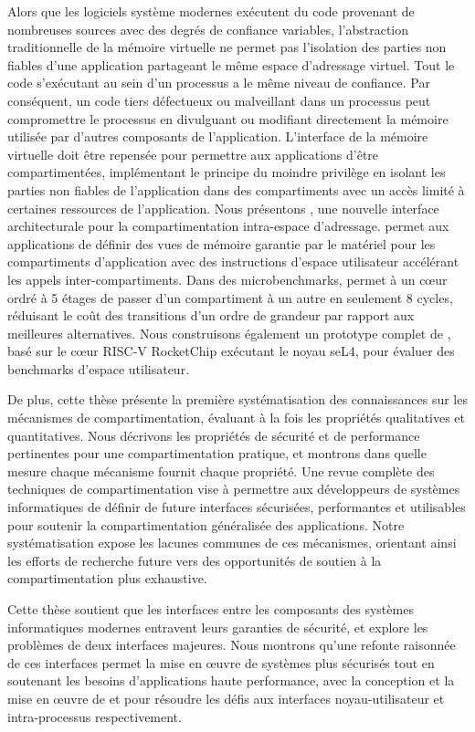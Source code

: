 Alors que les logiciels système modernes exécutent du code provenant de nombreuses sources avec des degrés de confiance variables, l'abstraction traditionnelle de la mémoire virtuelle ne permet pas l'isolation des parties non fiables d'une application partageant le même espace d'adressage virtuel. 
Tout le code s'exécutant au sein d'un processus a le même niveau de confiance. 
Par conséquent, un code tiers défectueux ou malveillant dans un processus peut compromettre le processus en divulguant ou modifiant directement la mémoire utilisée par d'autres composants de l'application. 
L'interface de la mémoire virtuelle doit être repensée pour permettre aux applications d'être compartimentées, implémentant le principe du moindre privilège en isolant les parties non fiables de l'application dans des compartiments avec un accès limité à certaines ressources de l'application. 
Nous présentons \seccells, une nouvelle interface architecturale pour la compartimentation intra-espace d'adressage. \seccells permet aux applications de définir des vues de mémoire garantie par le matériel pour les compartiments d'application avec des instructions d'espace utilisateur accélérant les appels inter-compartiments. 
Dans des microbenchmarks, \seccells permet à un cœur ordré à 5 étages de passer d'un compartiment à un autre en seulement 8 cycles, réduisant le coût des transitions d'un ordre de grandeur par rapport aux meilleures alternatives. 
Nous construisons également un prototype complet de \seccells, basé sur le cœur RISC-V RocketChip exécutant le noyau seL4, pour évaluer des benchmarks d'espace utilisateur.

De plus, cette thèse présente la première systématisation des connaissances sur les mécanismes de compartimentation, évaluant à la fois les propriétés qualitatives et quantitatives. 
Nous décrivons les propriétés de sécurité et de performance pertinentes pour une compartimentation pratique, et montrons dans quelle mesure chaque mécanisme fournit chaque propriété. 
Une revue complète des techniques de compartimentation vise à permettre aux développeurs de systèmes informatiques de définir de future interfaces sécurisées, performantes et utilisables pour soutenir la compartimentation généralisée des applications.
Notre systématisation expose les lacunes communes de ces mécanismes, orientant ainsi les efforts de recherche future vers des opportunités de soutien à la compartimentation plus exhaustive.

Cette thèse soutient que les interfaces entre les composants des systèmes informatiques modernes entravent leurs garanties de sécurité, et explore les problèmes de deux interfaces majeures. 
Nous montrons qu'une refonte raisonnée de ces interfaces permet la mise en œuvre de systèmes plus sécurisés tout en soutenant les besoins d'applications haute performance, avec la conception et la mise en œuvre de \midas et \seccells pour résoudre les défis aux interfaces noyau-utilisateur et intra-processus respectivement.